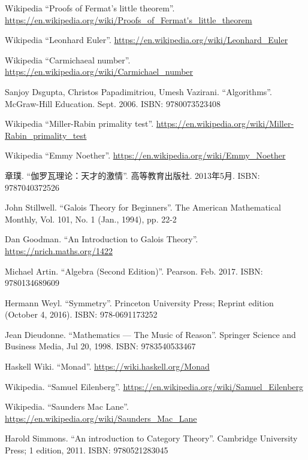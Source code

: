 \documentclass{article}
\begin{document}
\begin{thebibliography}{99}
Wikipedia ``Proofs of Fermat's little theorem''. \url{https://en.wikipedia.org/wiki/Proofs_of_Fermat's_little_theorem}

Wikipedia ``Leonhard Euler''. \url{https://en.wikipedia.org/wiki/Leonhard_Euler}

Wikipedia ``Carmichaeal number''. \url{https://en.wikipedia.org/wiki/Carmichael_number}

Sanjoy Dsgupta, Christos Papadimitriou, Umesh Vazirani. ``Algorithms''. McGraw-Hill Education. Sept. 2006. ISBN: 9780073523408

Wikipedia ``Miller-Rabin primality test''. \url{https://en.wikipedia.org/wiki/Miller-Rabin_primality_test}

Wikipedia ``Emmy Noether''. \url{https://en.wikipedia.org/wiki/Emmy_Noether}

{\fontspec{\cnmainft}章璞. ``伽罗瓦理论：天才的激情''. 高等教育出版社.} 2013年5月. ISBN: 9787040372526

John Stillwell. ``Galois Theory for Beginners''. The American Mathematical Monthly, Vol. 101, No. 1 (Jan., 1994), pp. 22-2

Dan Goodman. ``An Introduction to Galois Theory''. \url{https://nrich.maths.org/1422}

Michael Artin. ``Algebra (Second Edition)''. Pearson. Feb. 2017. ISBN: 9780134689609

Hermann Weyl. ``Symmetry''. Princeton University Press; Reprint edition (October 4, 2016). ISBN: 978-0691173252



Jean Dieudonne. ``Mathematics — The Music of Reason''. Springer Science and Business Media, Jul 20, 1998. ISBN: 9783540533467

Haskell Wiki. ``Monad''. \url{https://wiki.haskell.org/Monad}

Wikipedia. ``Samuel Eilenberg''. \url{https://en.wikipedia.org/wiki/Samuel_Eilenberg}

Wikipedia. ``Saunders Mac Lane''. \url{https://en.wikipedia.org/wiki/Saunders_Mac_Lane}

Harold Simmons. ``An introduction to Category Theory''.  Cambridge University Press; 1 edition, 2011. ISBN: 9780521283045


\end{thebibliography}
\end{document}
